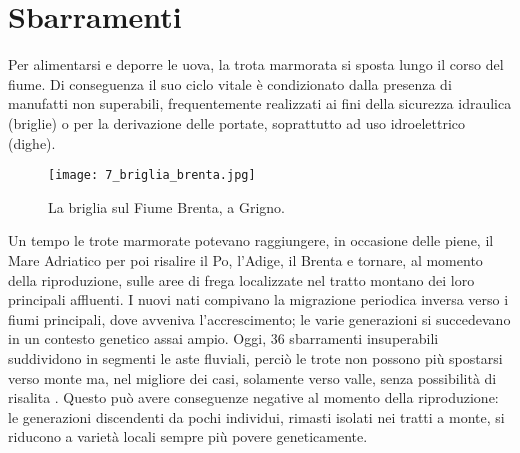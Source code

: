 \documentclass[10pt,twoside,openany,x11names,svgnames,italian,a5paper,dvipsnames,table]{memoir}
\begin{document}
\section{Sbarramenti}
Per alimentarsi e deporre le uova, la trota marmorata si sposta lungo il corso del fiume. Di conseguenza il suo ciclo vitale è condizionato dalla presenza di manufatti non superabili, frequentemente realizzati ai fini della sicurezza idraulica (briglie) o per la derivazione delle portate, soprattutto ad uso idroelettrico (dighe).
\begin{wrapfigure}[15]{l}{.6\textwidth}
\begin{center}
\vspace{-.4cm}
\texttt{[image: 7\_briglia\_brenta.jpg]}
\caption*{La briglia sul Fiume Brenta, a Grigno.}
\end{center}
\end{wrapfigure}
Un tempo le trote marmorate potevano raggiungere, in occasione delle piene, il Mare Adriatico per poi risalire il Po, l’Adige, il Brenta e tornare, al momento della riproduzione, sulle aree di frega localizzate nel tratto montano dei loro principali affluenti. I nuovi nati compivano la migrazione periodica inversa verso i fiumi principali, dove avveniva l’accrescimento; le varie generazioni si succedevano in un contesto genetico assai ampio.
Oggi, 36 sbarramenti insuperabili suddividono in segmenti le aste fluviali, perciò le trote non possono più spostarsi verso monte ma, nel migliore dei casi, solamente verso valle, senza possibilità di risalita \cite{Giovannini}. Questo può avere conseguenze negative al momento della riproduzione: le generazioni discendenti da pochi individui, rimasti isolati nei tratti a monte, si riducono a varietà locali sempre più povere geneticamente.
\end{document}
